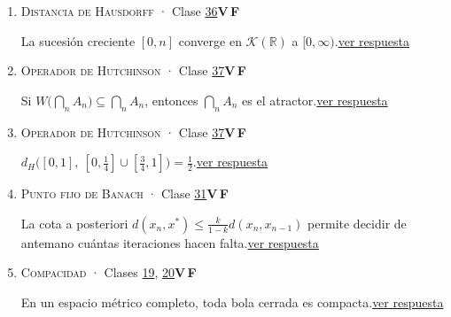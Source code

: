 \documentclass[11pt,a4paper]{article}
\newcommand{\R}{\mathbb{R}}\newcommand{\N}{\mathbb{N}}\newcommand{\Q}{\mathbb{Q}}
\begin{document}
\begin{enumerate}[leftmargin=2.2em,itemsep=8pt,label=\textbf{\arabic*.}]
\item[\hyperlink{r-13}{\textbf{13.}}] \hypertarget{q-13}{}{\small \textsc{Distancia de Hausdorff} · Clase \href{https://decostruttivismo.github.io/MAT2514-repaso/pdf/MAT2514_apuntes_completos.pdf\#nameddest=section.36}{36}}\hfill \textbf{V}\,\fbox{\rule{0pt}{6pt}\hspace{6pt}}\quad\textbf{F}\,\fbox{\rule{0pt}{6pt}\hspace{6pt}}\par La sucesión creciente $[0,n]$ converge en $\mathcal K(\R)$ a $[0,\infty)$.\hfill{\footnotesize\hyperlink{r-13}{ver respuesta}}
\item[\hyperlink{r-14}{\textbf{14.}}] \hypertarget{q-14}{}{\small \textsc{Operador de Hutchinson} · Clase \href{https://decostruttivismo.github.io/MAT2514-repaso/pdf/MAT2514_apuntes_completos.pdf\#nameddest=section.37}{37}}\hfill \textbf{V}\,\fbox{\rule{0pt}{6pt}\hspace{6pt}}\quad\textbf{F}\,\fbox{\rule{0pt}{6pt}\hspace{6pt}}\par Si $W\bigl(\bigcap_nA_n\bigr)\subseteq\bigcap_nA_n$, entonces $\bigcap_nA_n$ es el atractor.\hfill{\footnotesize\hyperlink{r-14}{ver respuesta}}
\item[\hyperlink{r-15}{\textbf{15.}}] \hypertarget{q-15}{}{\small \textsc{Operador de Hutchinson} · Clase \href{https://decostruttivismo.github.io/MAT2514-repaso/pdf/MAT2514_apuntes_completos.pdf\#nameddest=section.37}{37}}\hfill \textbf{V}\,\fbox{\rule{0pt}{6pt}\hspace{6pt}}\quad\textbf{F}\,\fbox{\rule{0pt}{6pt}\hspace{6pt}}\par $d_H\bigl([0,1],\ [0,\frac14]\cup[\frac34,1]\bigr)=\frac12$.\hfill{\footnotesize\hyperlink{r-15}{ver respuesta}}
\item[\hyperlink{r-16}{\textbf{16.}}] \hypertarget{q-16}{}{\small \textsc{Punto fijo de Banach} · Clase \href{https://decostruttivismo.github.io/MAT2514-repaso/pdf/MAT2514_apuntes_completos.pdf\#nameddest=section.31}{31}}\hfill \textbf{V}\,\fbox{\rule{0pt}{6pt}\hspace{6pt}}\quad\textbf{F}\,\fbox{\rule{0pt}{6pt}\hspace{6pt}}\par La cota a posteriori $d(x_n,x^*)\le\frac k{1-k}d(x_n,x_{n-1})$ permite decidir de antemano cuántas iteraciones hacen falta.\hfill{\footnotesize\hyperlink{r-16}{ver respuesta}}
\item[\hyperlink{r-17}{\textbf{17.}}] \hypertarget{q-17}{}{\small \textsc{Compacidad} · Clases \href{https://decostruttivismo.github.io/MAT2514-repaso/pdf/MAT2514_apuntes_completos.pdf\#nameddest=section.19}{19}, \href{https://decostruttivismo.github.io/MAT2514-repaso/pdf/MAT2514_apuntes_completos.pdf\#nameddest=section.20}{20}}\hfill \textbf{V}\,\fbox{\rule{0pt}{6pt}\hspace{6pt}}\quad\textbf{F}\,\fbox{\rule{0pt}{6pt}\hspace{6pt}}\par En un espacio métrico completo, toda bola cerrada es compacta.\hfill{\footnotesize\hyperlink{r-17}{ver respuesta}}

\end{enumerate}
\end{document}
